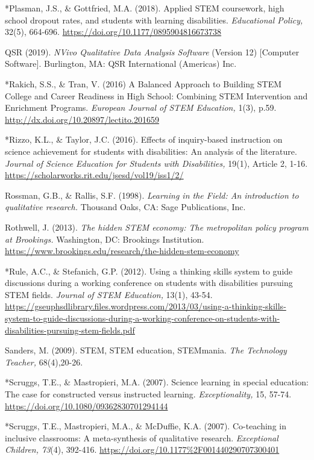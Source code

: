 \documentclass[11.5pt]{sig-alternate}
\begin{document}
*Plasman, J.S., \& Gottfried, M.A. (2018). Applied STEM coursework, high school dropout rates, and students with learning disabilities. \textit{Educational Policy,} 32(5), 664-696. \url{https://doi.org/10.1177/0895904816673738}

QSR (2019). \textit{NVivo Qualitative Data Analysis Software} (Version 12) [Computer Software]. Burlington, MA: QSR International (Americas) Inc.

*Rakich, S.S., \& Tran, V. (2016) A Balanced Approach to Building STEM College and Career Readiness in High School: Combining STEM Intervention and Enrichment Programs. \textit{European Journal of STEM Education,} 1(3), p.59. \url{http://dx.doi.org/10.20897/lectito.201659}

*Rizzo, K.L., \& Taylor, J.C. (2016). Effects of inquiry-based instruction on science achievement for students with disabilities: An analysis of the literature. \textit{Journal of Science Education for Students with Disabilities,} 19(1), Article 2, 1-16. \url{https://scholarworks.rit.edu/jsesd/vol19/iss1/2/}

Rossman, G.B., \& Rallis, S.F. (1998). \textit{Learning in the Field: An introduction to qualitative research.} Thousand Oaks, CA: Sage Publications, Inc. 

Rothwell, J. (2013). \textit{The hidden STEM economy: The metropolitan policy program at Brookings.} Washington, DC: Brookings Institution. \url{https://www.brookings.edu/research/the-hidden-stem-economy}

*Rule, A.C., \& Stefanich, G.P. (2012). Using a thinking skills system to guide discussions during a working conference on students with disabilities pursuing STEM fields. \textit{Journal of STEM Education,} 13(1), 43-54. \url{ https://gseuphsdlibrary.files.wordpress.com/2013/03/using-a-thinking-skills-system-to-guide-discussions-during-a-working-conference-on-students-with-disabilities-pursuing-stem-fields.pdf}

Sanders, M. (2009). STEM, STEM education, STEMmania. \textit{The Technology Teacher,} 68(4),20-26. 

*Scruggs, T.E., \& Mastropieri, M.A. (2007). Science learning in special education: The case for 
constructed versus instructed learning. \textit{Exceptionality,} 15, 57-74. \url{https://doi.org/10.1080/09362830701294144}

*Scruggs, T.E., Mastropieri, M.A., \& McDuffie, K.A. (2007). Co-teaching in inclusive classrooms: A meta-synthesis of qualitative research. \textit{Exceptional Children, 73}(4), 392-416. \url{https://doi.org/10.1177\%2F001440290707300401}
\end{document}

